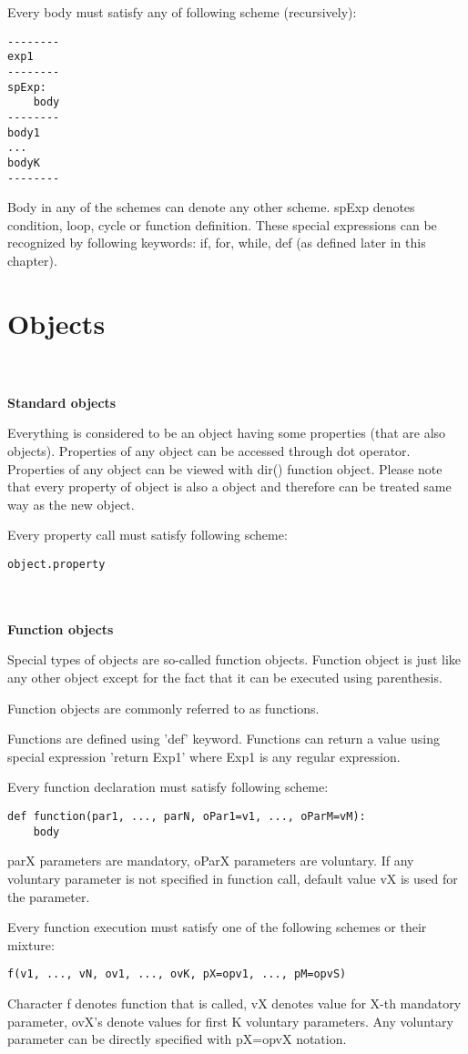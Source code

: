 \documentclass[11pt,oneside]{fithesis2}
\newcommand{\markit}[1]{\ \\\\{\noindent\textbf{#1}}}
\begin{document}
Every body must satisfy any of following scheme (recursively):
\begin{lstlisting}
--------
exp1
--------
spExp:
    body
--------
body1
...
bodyK
--------
\end{lstlisting}

Body in any of the schemes can denote any other scheme. spExp denotes condition, loop, cycle or function definition. These special expressions can be recognized by following keywords: if, for, while, def (as defined later in this chapter).

\section{Objects}
\markit{Standard objects}

Everything is considered to be an object having some properties (that are also objects). Properties of any object can be accessed through dot operator. Properties of any object can be viewed with dir() function object. Please note that every property of object is also a object and therefore can be treated same way as the new object.

Every property call must satisfy following scheme:
\begin{lstlisting}
object.property
\end{lstlisting}
\markit{Function objects}

Special types of objects are so-called function objects. Function object is just like any other object except for the fact that it can be executed using parenthesis.

Function objects are commonly referred to as functions.

Functions are defined using 'def' keyword. Functions can return a value using special expression 'return Exp1' where Exp1 is any regular expression.

Every function declaration must satisfy following scheme:
\begin{lstlisting}
def function(par1, ..., parN, oPar1=v1, ..., oParM=vM):
    body
\end{lstlisting}
parX parameters are mandatory, oParX parameters are voluntary.
If any voluntary parameter is not specified in function call, default value vX is used for the parameter.

Every function execution must satisfy one of the following schemes or their mixture:
\begin{lstlisting}
f(v1, ..., vN, ov1, ..., ovK, pX=opv1, ..., pM=opvS)
\end{lstlisting}
Character f denotes function that is called, vX denotes value for X-th mandatory parameter, ovX's denote values for first K voluntary parameters. Any voluntary parameter can be directly specified with pX=opvX notation.
\end{document}
